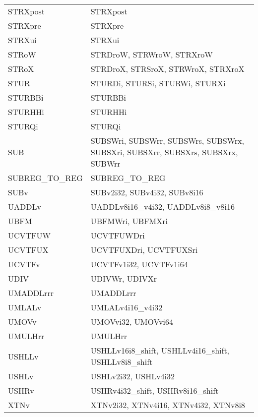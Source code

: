 \begin{xltabular}{\textwidth}{lX}
    STRXpost & STRXpost \\
    STRXpre & STRXpre \\
    STRXui & STRXui \\
    STRoW & STRDroW, STRWroW, STRXroW \\
    STRoX & STRDroX, STRSroX, STRWroX, STRXroX \\
    STUR & STURDi, STURSi, STURWi, STURXi \\
    STURBBi & STURBBi \\
    STURHHi & STURHHi \\
    STURQi & STURQi \\
    SUB & SUBSWri, SUBSWrr, SUBSWrs, SUBSWrx, SUBSXri, SUBSXrr, SUBSXrs, SUBSXrx, SUBWrr \\
    SUBREG\_TO\_REG & SUBREG\_TO\_REG \\
    SUBv & SUBv2i32, SUBv4i32, SUBv8i16 \\
    UADDLv & UADDLv8i16\_v4i32, UADDLv8i8\_v8i16 \\
    UBFM & UBFMWri, UBFMXri \\
    UCVTFUW & UCVTFUWDri \\
    UCVTFUX & UCVTFUXDri, UCVTFUXSri \\
    UCVTFv & UCVTFv1i32, UCVTFv1i64 \\
    UDIV & UDIVWr, UDIVXr \\
    UMADDLrrr & UMADDLrrr \\
    UMLALv & UMLALv4i16\_v4i32 \\
    UMOVv & UMOVvi32, UMOVvi64 \\
    UMULHrr & UMULHrr \\
    USHLLv & USHLLv16i8\_shift, USHLLv4i16\_shift, USHLLv8i8\_shift \\
    USHLv & USHLv2i32, USHLv4i32 \\
    USHRv & USHRv4i32\_shift, USHRv8i16\_shift \\
    XTNv & XTNv2i32, XTNv4i16, XTNv4i32, XTNv8i8 \\
\end{xltabular}

\newpage
